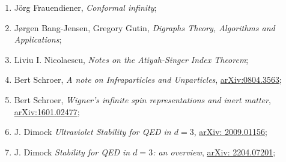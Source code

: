 \documentclass[a4paper,11pt]{article}
\begin{document}
\begin{enumerate}
\item J\"{o}rg Frauendiener, \textit{Conformal infinity};



\item J\o rgen Bang-Jensen, Gregory Gutin, \textit{Digraphs Theory,
    Algorithms and Applications};



\item Liviu I. Nicolaescu, \textit{Notes on the Atiyah-Singer Index
    Theorem};



\item Bert Schroer, \textit{A note on Infraparticles and Unparticles},
  \href{https://arxiv.org/abs/0804.3563}{arXiv:0804.3563};



\item Bert Schroer, \textit{Wigner's infinite spin representations and
    inert matter},
  \href{https://arxiv.org/abs/1601.02477}{arXiv:1601.02477};



\item J. Dimock \textit{Ultraviolet Stability for QED in $d = 3$},
  \href{https://arxiv.org/abs/2009.01156}{arXiv: 2009.01156};



\item J. Dimock \textit{Stability for QED in $d = 3$: an overview},
  \href{https://arxiv.org/abs/2204.07201}{arXiv: 2204.07201};




\end{enumerate}
\end{document}
